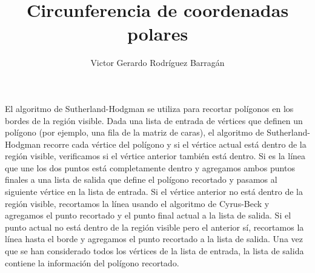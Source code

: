 \documentclass{article}
\title{Circunferencia de coordenadas polares}
\author{Victor Gerardo Rodríguez Barragán}
\date{}
\begin{document}
\maketitle
\justify

El algoritmo de Sutherland-Hodgman se utiliza para recortar polígonos en los bordes de la región visible.
Dada una lista de entrada de vértices que definen un polígono (por ejemplo, una fila de la matriz de caras),
el algoritmo de Sutherland-Hodgman recorre cada vértice del polígono y si el vértice actual está dentro de la región visible,
verificamos si el vértice anterior también está dentro.
Si es la línea que une los dos puntos está completamente dentro y agregamos ambos puntos finales a una lista de salida
que define el polígono recortado y pasamos al siguiente vértice en la lista de entrada.
Si el vértice anterior no está dentro de la región visible, recortamos la línea usando el algoritmo de Cyrus-Beck y agregamos
el punto recortado y el punto final actual a la lista de salida. Si el punto actual no está dentro de la región visible pero el anterior sí,
recortamos la línea hasta el borde y agregamos el punto recortado a la lista de salida.
Una vez que se han considerado todos los vértices de la lista de entrada, la lista de salida contiene la información del polígono recortado.
\end{document}
